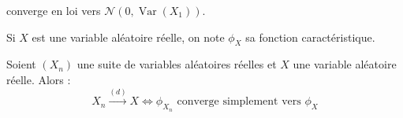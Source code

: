 


	
	 converge en loi vers $\mathcal{N}(0, \operatorname{Var}(X_1))$.
	
	\begin{notation}
		Si $X$ est une variable aléatoire réelle, on note $\phi_X$ sa fonction caractéristique.
	\end{notation}
	
	
	\begin{theorem}[Lévy]
		\label{theoreme-central-limite-1}
		Soient $(X_n)$ une suite de variables aléatoires réelles et $X$ une variable aléatoire réelle. Alors :
		\[ X_n \overset{(d)}{\longrightarrow} X \iff \phi_{X_n} \text{ converge simplement vers } \phi_X \]
	\end{theorem}

